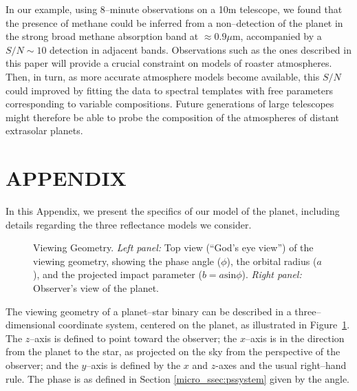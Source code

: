 In our example, using 8--minute observations on a 10m telescope, we
found that the presence of methane could be inferred from a
non--detection of the planet in the strong broad methane absorption
band at $\approx 0.9\mu$m, accompanied by a $S/N\sim 10$ detection in
adjacent bands.  Observations such as the ones described in this paper
will provide a crucial constraint on models of roaster atmospheres.
Then, in turn, as more accurate atmosphere models become available,
this $S/N$ could improved by fitting the data to
spectral templates with free parameters corresponding to variable
compositions.  Future generations of large telescopes might therefore be 
able to probe the composition of the atmospheres of distant extrasolar
planets.



\section*{APPENDIX}
\label{micro_sec:appendix}

In this Appendix, we present the specifics of our model of the planet,
including details regarding the three reflectance models we consider.
%
\begin{figure}[p]
\caption[Viewing Geometry.]{Viewing Geometry. {\em Left panel:} Top
view (``God's eye view'') of the viewing geometry, showing the phase
angle ($\phi$), the orbital radius ($a$), and the projected impact
parameter ($b = a \mathrm{sin}\phi$).  {\em Right panel:} Observer's
view of the planet.}
\label{micro_fig:viewgeom} 
\end{figure}
\afterpage{\clearpage}

The viewing geometry of a planet--star binary can be described in a
three--dimensional coordinate system, centered on the planet, as
illustrated in Figure~\ref{micro_fig:viewgeom}.  The $z$--axis is defined to
point toward the observer; the $x$--axis is in the direction from the
planet to the star, as projected on the sky from the perspective of
the observer; and the $y$--axis is defined by the $x$ and $z$-axes and
the usual right--hand rule.  The phase is as defined in Section
\ref{micro_ssec:pssystem} given by the angle.

